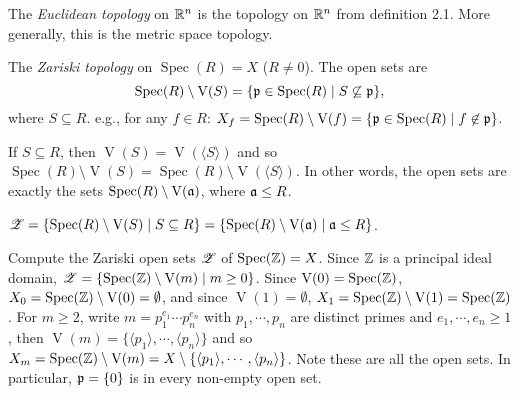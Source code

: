 \begin{example}
    The \emph{Euclidean topology} on $\mathbb{R}^n$ is the topology on $\mathbb{R}^n$ from definition 2.1. More generally, this is the metric space topology.
\end{example}

\begin{definition}
    The \emph{Zariski topology} on $\operatorname{Spec}(R) = X$ ($R \neq 0$). The open sets are 
    \[\operatorname{Spec}(R) \setminus \operatorname{V}(S) = \{\mathfrak{p} \in \operatorname{Spec}(R) \mid S \not \subseteq \mathfrak{p}\},\] 
    where $S \subseteq R$. e.g., for any $f \in R$: $X_f = \operatorname{Spec}(R) \setminus \operatorname{V}(f) = \{\mathfrak{p} \in \operatorname{Spec}(R) \mid f \not \in \mathfrak{p}\}$.
\end{definition}

\begin{proposition}
    If $S \subseteq R$, then $\operatorname{V}(S) = \operatorname{V}(\langle S \rangle)$ and so $\operatorname{Spec}(R) \setminus \operatorname{V}(S) = \operatorname{Spec}(R) \setminus \operatorname{V}(\langle S \rangle)$. In other words, the open sets are exactly the sets $\operatorname{Spec}(R) \setminus \operatorname{V}(\mathfrak{a})$, where $\mathfrak{a} \leq R$.
\end{proposition}

\begin{notation*}
    $\mathscr{Z} = \{\operatorname{Spec}(R) \setminus \operatorname{V}(S) \mid S \subseteq R\} = \{\operatorname{Spec}(R) \setminus \operatorname{V}(\mathfrak{a}) \mid \mathfrak{a} \leq R\}$.
\end{notation*}

\begin{example}
    Compute the Zariski open sets $\mathscr{Z}$ of $\operatorname{Spec}(\mathbb{Z}) = X$. Since $\mathbb{Z}$ is a principal ideal domain, $\mathscr{Z} = \{\operatorname{Spec}(\mathbb{Z}) \setminus \operatorname{V}(m) \mid m \geq 0\}$. Since $\operatorname{V}(0) = \operatorname{Spec}(\mathbb{Z})$, $X_0 = \operatorname{Spec}(\mathbb{Z}) \setminus \operatorname{V}(0) = \emptyset$, and since $\operatorname{V}(1) = \emptyset$, $X_1 = \operatorname{Spec}(\mathbb{Z}) \setminus \operatorname{V}(1) = \operatorname{Spec}(\mathbb{Z})$. For $m \geq 2$, write $m = p_1^{e_1} \cdots p_n^{e_n}$ with $p_1,\cdots,p_n$ are distinct primes and $e_1,\cdots,e_n \geq 1$, then $\operatorname{V}(m) = \{\langle p_1 \rangle, \cdots, \langle p_n \rangle\}$ and so $X_m = \operatorname{Spec}(\mathbb{Z}) \setminus \operatorname{V}(m) = X \setminus \{\langle p_1 \rangle,\cdots, \langle p_n \rangle\}$. Note these are all the open sets. In particular, $\mathfrak{p} = \{0\}$ is in every non-empty open set.
\end{example}


